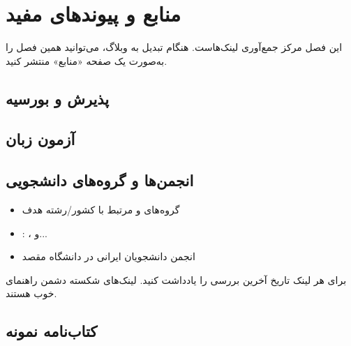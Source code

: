 \chapter{منابع و پیوندهای مفید}
\label{ch:resources}

این فصل مرکز جمع‌آوری لینک‌هاست. هنگام تبدیل به وبلاگ،
می‌توانید همین فصل را به‌صورت یک صفحه «منابع» منتشر کنید.

\section{پذیرش و بورسیه}

\begin{weblinks}
\end{weblinks}

\section{آزمون زبان}

\begin{weblinks}
\end{weblinks}

\section{انجمن‌ها و گروه‌های دانشجویی}

\begin{itemize}
  \item گروه‌های  و  مرتبط با کشور/رشته هدف
  \item {}: ،  و...
  \item انجمن دانشجویان ایرانی در دانشگاه مقصد
\end{itemize}

\begin{infobox}[title={نگهداری لینک‌ها}]
  برای هر لینک تاریخ آخرین بررسی را یادداشت کنید.
  لینک‌های شکسته دشمن راهنمای خوب هستند.
\end{infobox}

\section{کتاب‌نامه نمونه}

\cite{studyincanada2024}
